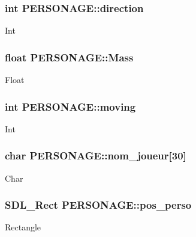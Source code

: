 \subsubsection[{\texorpdfstring{direction}{direction}}]{\setlength{\rightskip}{0pt plus 5cm}int P\+E\+R\+S\+O\+N\+A\+G\+E\+::direction}\hypertarget{structPERSONAGE_a1a098d28a8c9867a93df293d4f6731fb}{}\label{structPERSONAGE_a1a098d28a8c9867a93df293d4f6731fb}
Int 
\subsubsection[{\texorpdfstring{Mass}{Mass}}]{\setlength{\rightskip}{0pt plus 5cm}float P\+E\+R\+S\+O\+N\+A\+G\+E\+::\+Mass}\hypertarget{structPERSONAGE_aa23d53bb20cc721798d1400f5e121af9}{}\label{structPERSONAGE_aa23d53bb20cc721798d1400f5e121af9}
Float 
\subsubsection[{\texorpdfstring{moving}{moving}}]{\setlength{\rightskip}{0pt plus 5cm}int P\+E\+R\+S\+O\+N\+A\+G\+E\+::moving}\hypertarget{structPERSONAGE_a48bc0c626e0210e735c49ba6df5d13e6}{}\label{structPERSONAGE_a48bc0c626e0210e735c49ba6df5d13e6}
Int 
\subsubsection[{\texorpdfstring{nom\+\_\+joueur}{nom_joueur}}]{\setlength{\rightskip}{0pt plus 5cm}char P\+E\+R\+S\+O\+N\+A\+G\+E\+::nom\+\_\+joueur\mbox{[}30\mbox{]}}\hypertarget{structPERSONAGE_a6427edb6392463410ad168649b33e410}{}\label{structPERSONAGE_a6427edb6392463410ad168649b33e410}
Char 
\subsubsection[{\texorpdfstring{pos\+\_\+perso}{pos_perso}}]{\setlength{\rightskip}{0pt plus 5cm}S\+D\+L\+\_\+\+Rect P\+E\+R\+S\+O\+N\+A\+G\+E\+::pos\+\_\+perso}\hypertarget{structPERSONAGE_a251556a634db6d532af5f928b8a0abe4}{}\label{structPERSONAGE_a251556a634db6d532af5f928b8a0abe4}
Rectangle 
